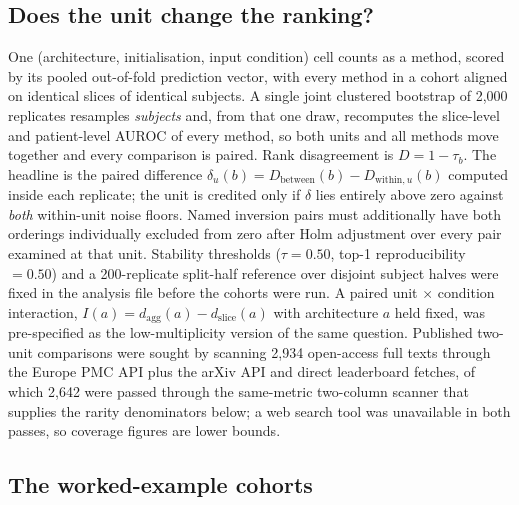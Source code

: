 \documentclass[11pt,a4paper]{article}
\begin{document}
\subsection{Does the unit change the ranking?}

One (architecture, initialisation, input condition) cell counts as a method,
scored by its pooled out-of-fold prediction vector, with every method in a cohort
aligned on identical slices of identical subjects. A single joint clustered
bootstrap of 2,000 replicates resamples \emph{subjects} and, from that one draw,
recomputes the slice-level and patient-level AUROC of every method, so both units
and all methods move together and every comparison is paired. Rank disagreement
is $D=1-\tau_b$. The headline is the paired difference
$\delta_u(b)=D_{\text{between}}(b)-D_{\text{within},u}(b)$ computed inside each
replicate; the unit is credited only if $\delta$ lies entirely above zero against
\emph{both} within-unit noise floors. Named inversion pairs must additionally
have both orderings individually excluded from zero after Holm adjustment
\citep{holm1979} over every pair examined at that unit. Stability thresholds
($\tau=0.50$, top-1 reproducibility $=0.50$) and a 200-replicate split-half
reference over disjoint subject halves were fixed in the analysis file before the
cohorts were run. A paired unit $\times$ condition interaction,
$I(a)=d_{\text{agg}}(a)-d_{\text{slice}}(a)$ with architecture $a$ held fixed,
was pre-specified as the low-multiplicity version of the same question. Published
two-unit comparisons were sought by scanning 2,934 open-access full texts through
the Europe PMC API plus the arXiv API and direct leaderboard fetches, of which
2,642 were passed through the same-metric two-column scanner that supplies the
rarity denominators below; a web search tool was unavailable in both passes, so
coverage figures are lower bounds.

\subsection{The worked-example cohorts}
\end{document}

